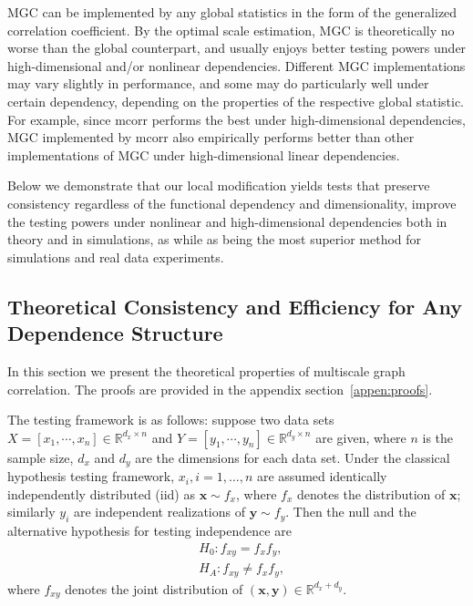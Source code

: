 \documentclass[11pt]{article}
\providecommand{\mb}[1]{\boldsymbol{#1}}
\newcommand{\Real}{\mathbb{R}}
\begin{document}
MGC can be implemented by any global statistics in the form of the generalized correlation coefficient. By the optimal scale estimation, MGC is theoretically no worse than the global counterpart, and usually enjoys better testing powers under high-dimensional and/or nonlinear dependencies. Different MGC implementations may vary slightly in performance, and some may do particularly well under certain dependency, depending on the properties of the respective global statistic. For example, since mcorr performs the best under high-dimensional dependencies, MGC implemented by mcorr also empirically performs better than other implementations of MGC under high-dimensional linear dependencies. 

Below we demonstrate that our local modification yields tests that preserve consistency regardless of the functional dependency and dimensionality, improve the testing powers under nonlinear and high-dimensional dependencies both in theory and in simulations, as while as being the most superior method for simulations and real data experiments.


\subsection{Theoretical Consistency and Efficiency for Any Dependence Structure}
\label{main2}
In this section we present the theoretical properties of multiscale graph correlation. The proofs are provided in the appendix section~\ref{appen:proofs}. 

The testing framework is as follows: suppose two data sets $X=[x_{1},\cdots, x_{n}] \in \Real^{d_{x} \times n}$ and $Y=[y_{1},\cdots, y_{n}] \in \Real^{d_{y} \times n}$ are given, where $n$ is the sample size, $d_{x}$ and $d_{y}$ are the dimensions for each data set. Under the classical hypothesis testing framework, $x_{i}, i=1,\ldots,n$ are assumed identically independently distributed (iid) as $\mb{x} \sim f_{x}$, where $f_{x}$ denotes the distribution of $\mb{x}$; similarly $y_{i}$ are independent realizations of $\mb{y} \sim f_{y}$. Then the null and the alternative hypothesis for testing independence are
\begin{align*}
& H_{0}: f_{xy}=f_{x}f_{y},\\
& H_{A}: f_{xy} \neq f_{x}f_{y},
\end{align*}
where $f_{xy}$ denotes the joint distribution of $(\mb{x},\mb{y}) \in \Real^{d_{x} + d_{y}}$. 
\end{document}
